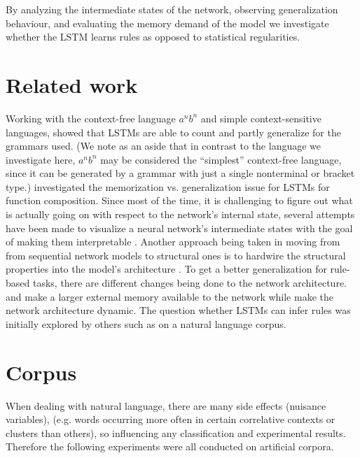 \documentclass[11pt,a4paper]{article}
\begin{document}
By analyzing the intermediate states of the network, observing generalization behaviour, and evaluating the memory demand of the model we investigate whether the LSTM learns rules as opposed to statistical regularities.

\section{Related work}
Working with the context-free language $a^nb^n$ and simple context-sensitive languages, \citeauthor{gers2001lstm}  showed that LSTMs are able to count and partly generalize for the grammars used.  (We note as an aside that in contrast to the language we investigate here, $a^nb^n$ may be considered the ``simplest'' context-free language, since it can be generated by a grammar with just a single nonterminal or bracket type.)
\citeauthor{liska2018memorize}  investigated the memorization vs. generalization issue for LSTMs for function composition. Since most of the time, it is challenging to figure out what is actually going on with respect to the network's internal state, several attempts have been made to visualize a neural network's intermediate states \cite{rauber2017visualizing, karpathy2015visualizing} with the goal of making them interpretable \cite{krakovna2016increasing}.
Another approach being taken in moving from from sequential network models to structural ones is to hardwire the structural properties into the model's architecture \cite{tai2015improved, kiperwasser2016simple, joulin2015inferring}.
To get a better generalization for rule-based tasks, there are different changes being done to the network architecture. \citeauthor{graves2014neural}  and \citeauthor{sukhbaatar2015end}  make a larger external memory available to the network while \citeauthor{moshe2017deep}  make the network architecture dynamic.
The question whether LSTMs can infer rules was initially explored by others such as \cite{linzen2016assessing} on a natural language corpus.

\section{Corpus}
\label{sec:corpus}
When dealing with natural language, there are many side effects (nuisance variables),  (e.g. words occurring more often in certain correlative contexts or clusters than others), so influencing any classification and experimental results. Therefore the following experiments were all conducted on artificial corpora.
\end{document}
